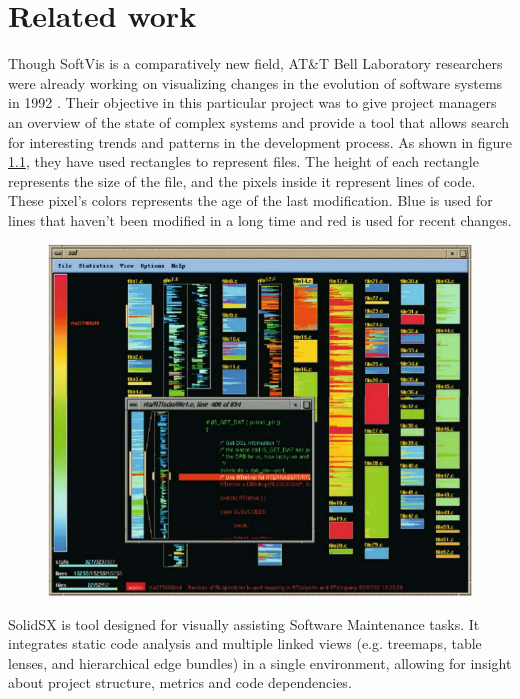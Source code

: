 \chapter{Related work} \label{sec:related}
Though SoftVis is a comparatively new field, AT\&T Bell Laboratory researchers were already working on visualizing changes in the evolution of software systems in 1992 \cite{seesoft}. Their objective in this particular project was to give project managers an overview of the state of complex systems and provide a tool that allows search for interesting trends and patterns in the development process. As shown in figure \ref{fig:seesoft}, they have used rectangles to represent files. The height of each rectangle represents the size of the file, and the pixels inside it represent lines of code. These pixel's colors represents the age of the last modification. Blue is used for lines that haven't been modified in a long time and red is used for recent changes.

\begin{figure}[H]
	\centering
	\includegraphics[width=1.0\textwidth]{figures/seesoft.png}
	\caption{}
	\label{fig:seesoft}
\end{figure}

SolidSX is tool designed for visually assisting Software Maintenance tasks. It integrates static code analysis and multiple linked views (e.g. treemaps, table lenses, and hierarchical edge bundles) in a single environment, allowing for insight about project structure, metrics and code dependencies.

